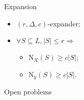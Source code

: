 \begin{frame}{Expansion}

    \begin{minipage}{0.38\linewidth}
        \centering
        
    \end{minipage}
    \begin{minipage}{0.58\linewidth}
        \begin{itemize}
            \item $(r, \Delta, c)$-expander;
            \item $\forall S \subseteq L, |S| \le r \Rightarrow$
                \begin{itemize}
                    \item $\mathrm{N}_{X}(S) \ge c |S|$;
                    \item $\mathrm{N}_{y}(S) \ge c |S|$.
                \end{itemize}
        \end{itemize}
    \end{minipage}


\end{frame}


\begin{frame}{Open problems}

\end{frame}